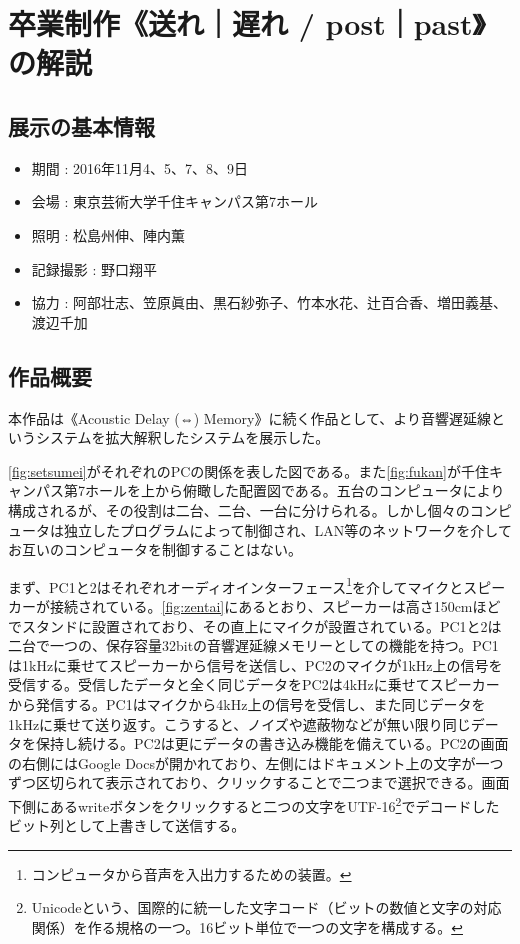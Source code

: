\documentclass[a4paper,report]{jsbook}
\begin{document}
\section{卒業制作《送れ｜遅れ /
post｜past》の解説}\label{ux5352ux696dux5236ux4f5cux9001ux308cux9045ux308c-postpastux306eux89e3ux8aac}

\subsection{展示の基本情報}\label{ux5c55ux793aux306eux57faux672cux60c5ux5831-1}

\begin{itemize}
\tightlist
\item
  期間 : 2016年11月4、5、7、8、9日
\item
  会場 : 東京芸術大学千住キャンパス第7ホール
\item
  照明 : 松島州伸、陣内薫
\item
  記録撮影 : 野口翔平
\item
  協力 :
  阿部壮志、笠原眞由、黒石紗弥子、竹本水花、辻百合香、増田義基、渡辺千加
\end{itemize}

\subsection{作品概要}\label{ux4f5cux54c1ux6982ux8981-2}

本作品は《Acoustic Delay (⇔)
Memory》に続く作品として、より音響遅延線というシステムを拡大解釈したシステムを展示した。

\cref{fig:setsumei}がそれぞれのPCの関係を表した図である。また\cref{fig:fukan}が千住キャンパス第7ホールを上から俯瞰した配置図である。五台のコンピュータにより構成されるが、その役割は二台、二台、一台に分けられる。しかし個々のコンピュータは独立したプログラムによって制御され、LAN等のネットワークを介してお互いのコンピュータを制御することはない。

まず、PC1と2はそれぞれオーディオインターフェース\footnote{コンピュータから音声を入出力するための装置。}を介してマイクとスピーカーが接続されている。\cref{fig:zentai}にあるとおり、スピーカーは高さ150cmほどでスタンドに設置されており、その直上にマイクが設置されている。PC1と2は二台で一つの、保存容量32bitの音響遅延線メモリーとしての機能を持つ。PC1は1kHzに乗せてスピーカーから信号を送信し、PC2のマイクが1kHz上の信号を受信する。受信したデータと全く同じデータをPC2は4kHzに乗せてスピーカーから発信する。PC1はマイクから4kHz上の信号を受信し、また同じデータを1kHzに乗せて送り返す。こうすると、ノイズや遮蔽物などが無い限り同じデータを保持し続ける。PC2は更にデータの書き込み機能を備えている。PC2の画面の右側にはGoogle
Docsが開かれており、左側にはドキュメント上の文字が一つずつ区切られて表示されており、クリックすることで二つまで選択できる。画面下側にあるwriteボタンをクリックすると二つの文字をUTF-16\footnote{Unicodeという、国際的に統一した文字コード（ビットの数値と文字の対応関係）を作る規格の一つ。16ビット単位で一つの文字を構成する。}でデコードしたビット列として上書きして送信する。
\end{document}
